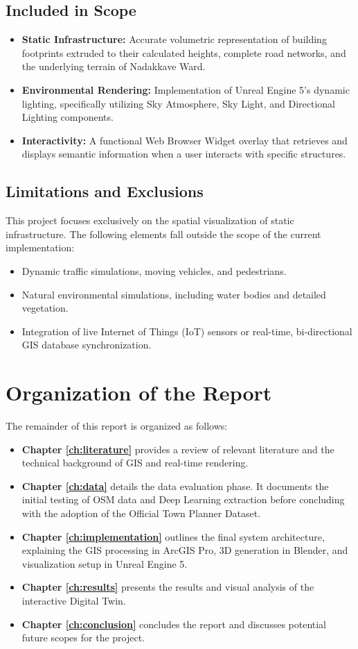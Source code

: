 \subsection{Included in Scope}
\begin{itemize}
    \item \textbf{Static Infrastructure:} Accurate volumetric representation of building footprints extruded to their calculated heights, complete road networks, and the underlying terrain of Nadakkave Ward.
    \item \textbf{Environmental Rendering:} Implementation of Unreal Engine 5's dynamic lighting, specifically utilizing Sky Atmosphere, Sky Light, and Directional Lighting components.
    \item \textbf{Interactivity:} A functional Web Browser Widget overlay that retrieves and displays semantic information when a user interacts with specific structures.
\end{itemize}

\subsection{Limitations and Exclusions}
This project focuses exclusively on the spatial visualization of static infrastructure. The following elements fall outside the scope of the current implementation:
\begin{itemize}
    \item Dynamic traffic simulations, moving vehicles, and pedestrians.
    \item Natural environmental simulations, including water bodies and detailed vegetation.
    \item Integration of live Internet of Things (IoT) sensors or real-time, bi-directional GIS database synchronization.
\end{itemize}

\section{Organization of the Report}
The remainder of this report is organized as follows:
\begin{itemize}
    \item \textbf{Chapter \ref{ch:literature}} provides a review of relevant literature and the technical background of GIS and real-time rendering.
    \item \textbf{Chapter \ref{ch:data}} details the data evaluation phase. It documents the initial testing of OSM data and Deep Learning extraction before concluding with the adoption of the Official Town Planner Dataset.
    \item \textbf{Chapter \ref{ch:implementation}} outlines the final system architecture, explaining the GIS processing in ArcGIS Pro, 3D generation in Blender, and visualization setup in Unreal Engine 5.
    \item \textbf{Chapter \ref{ch:results}} presents the results and visual analysis of the interactive Digital Twin.
    \item \textbf{Chapter \ref{ch:conclusion}} concludes the report and discusses potential future scopes for the project.
\end{itemize}

